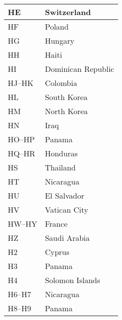 \begin{longtable}{|l|l|}
  \hline
  HE                  & Switzerland                               \\
  \hline
  HF                  & Poland                                    \\
  \hline
  HG                  & Hungary                                   \\
  \hline
  HH                  & Haiti                                     \\
  \hline
  HI                  & Dominican Republic                        \\
  \hline
  HJ--HK              & Colombia                                  \\
  \hline
  HL                  & South Korea                               \\
  \hline
  HM                  & North Korea                               \\
  \hline
  HN                  & Iraq                                      \\
  \hline
  HO--HP              & Panama                                    \\
  \hline
  HQ--HR              & Honduras                                  \\
  \hline
  HS                  & Thailand                                  \\
  \hline
  HT                  & Nicaragua                                 \\
  \hline
  HU                  & El Salvador                               \\
  \hline
  HV                  & Vatican City                              \\
  \hline
  HW--HY              & France                                    \\
  \hline
  HZ                  & Saudi Arabia                              \\
  \hline
  H2                  & Cyprus                                    \\
  \hline
  H3                  & Panama                                    \\
  \hline
  H4                  & Solomon Islands                           \\
  \hline
  H6--H7              & Nicaragua                                 \\
  \hline
  H8--H9              & Panama                                    \\
  \hline

\end{longtable}
